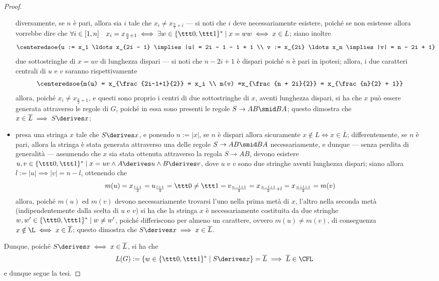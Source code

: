 \documentclass[a4paper, 12pt]{report}
\begin{document}
\begin{proof}
\begin{itemize}
                diversamente, se $n$ è pari, allora sia $i$ tale che $x_i \neq x_{\frac{n}{2} + i}$ --- si noti che $i$ deve necessariamente esistere, poiché se non esistesse allora vorrebbe dire che $\forall i \in [1, n] \quad x_i = x_{\frac{n}{2} + 1} \iff \exists w \in \{\ttt 0, \ttt 1\}^* \mid x = ww \iff x \in L$; siano inoltre $$\centeredsoe{u := x_1 \ldots x_{2i - 1} \implies |u| = 2i - 1 - 1 + 1 \\ v := x_{2i} \ldots x_n \implies |v| = n - 2i + 1}$$ due sottostringhe di $x = uv$ di lunghezza dispari --- si noti che $n - 2i + 1$ è dispari poiché $n$ è pari in ipotesi; allora, i due caratteri centrali di $u$ e $v$ saranno rispettivamente $$\centeredsoe{m(u) = x_{\frac{2i-1+1}{2}} = x_i \\ m(v) =x_{\frac{n + 2i}{2}} = x_{\frac{n}{2} + 1}}$$ allora, poiché $x_i \neq x_{\frac{n}{2} + 1}$, e questi sono proprio i centri di due sottostringhe di $x$, aventi lunghezza dispari, si ha che $x$ può essere generata attraverso le regole di $G$, poiché in essa sono presenti le regole $S \to AB \smid BA$; questo dimostra che $x \in \overline L \implies S \derives x$;
            \item presa una stringa $x$ tale che $S \derives x$, e ponendo $n := |x|$, se $n$ è dispari allora sicuramente $x \notin L \iff x \in \overline L$; differentemente, se $n$ è pari, allora la stringa è stata generata attraverso una delle regole $S \to AB \smid BA$ necessariamente, e dunque --- senza perdita di generalità --- assumendo che $x$ sia stata ottenuta attraverso la regola $S \to AB$, devono esistere $u, v \in \{\ttt 0, \ttt 1\}^* \mid x = uv \land A \derives u \land B \derives v$, dove $u$ e $v$ sono due stringhe aventi lunghezza dispari; siano allora $l := |u| \implies |v| = n - l$, ottenendo che $$m (u) = x_{\frac{l + 1}{2}} = u_{\frac{l + 1}{2}} = \ttt 0 \neq \ttt 1 = v_{\frac{n - l + 1}{2}} = x_{\frac{n - l + 1}{2} + l} = x_{\frac{n + l + 1}{2}} = m(v)$$ allora, poiché $m(u)$ ed $m(v)$ devono necessariamente trovarsi l'uno nella prima metà di $x$, l'altro nella seconda metà (indipendentemente dalla scelta di $u$ e $v$) si ha che la stringa $x$ è necessariamente costituita da due stringhe $w, w' \in \{\ttt 0, \ttt 1\}^* \mid w \neq w'$, poiché differiscono per almeno un carattere, ovvero $m(u) \neq m(v)$, di conseguenza $x \notin \L \iff x \in \overline L$; questo dimostra che $S \derives x \implies x \in \overline L$.
        \end{itemize}

        Dunque, poiché $S \derives x \iff x \in \overline L$, si ha che $$L(G) := \{w \in \{\ttt 0, \ttt 1\}^* \mid S \derives x\} = \overline L \implies \overline L \in \mathrm{\CFL}$$ e dunque segue la tesi.
    \end{proof}
\end{document}
